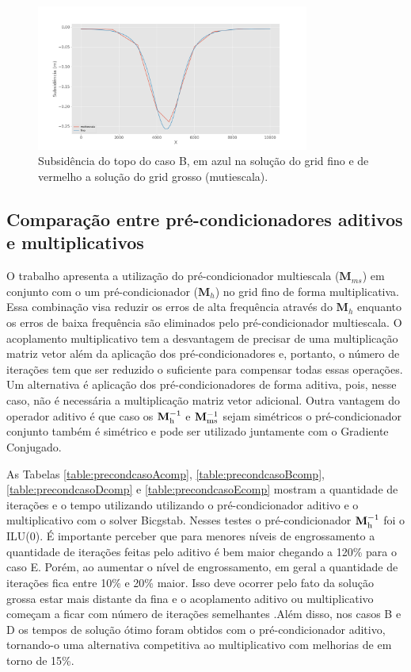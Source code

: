 \begin{figure}[!htbp]
\centering
\includegraphics[width=0.8\textwidth]{chap08/figs/Reservoir320x320_10x10_subsidence_multiscale.png}
\caption{Subsidência do topo do caso B, em azul na solução do grid fino e de vermelho a solução do grid grosso (mutiescala). }
\label{fig:subsidence} 
\end{figure}


\subsection{Comparação entre pré-condicionadores aditivos e multiplicativos}

O trabalho \cite{casteletto} apresenta a utilização do pré-condicionador multiescala ($\mathbf{M}_{ms}$) em conjunto com o um pré-condicionador ($\mathbf{M}_h$) no grid fino de forma multiplicativa. 
Essa combinação visa reduzir os erros de alta frequência através do $\mathbf{M}_h$ enquanto os erros de baixa frequência são eliminados pelo pré-condicionador multiescala. 
O acoplamento multiplicativo tem a desvantagem de precisar de uma multiplicação matriz vetor além da aplicação dos pré-condicionadores
e, portanto, o número de iterações tem que ser reduzido o suficiente para compensar todas essas operações. Um alternativa é aplicação
dos pré-condicionadores de forma aditiva, pois, nesse caso, não é necessária a multiplicação matriz vetor adicional. Outra vantagem do operador aditivo é que caso os $\mathbf{M}^{-1}_{\text{h}}$ e $\mathbf{M}^{-1}_{\text{ms}}$ sejam simétricos o pré-condicionador conjunto também é simétrico e pode ser utilizado juntamente com o Gradiente Conjugado.


As Tabelas \ref{table:precondcasoAcomp}, \ref{table:precondcasoBcomp}, \ref{table:precondcasoDcomp} e \ref{table:precondcasoEcomp} mostram a quantidade de iterações e o tempo utilizando utilizando o pré-condicionador aditivo e o multiplicativo com o solver Bicgstab. Nesses testes o pré-condicionador $\mathbf{M}^{-1}_{\text{h}}$ foi o ILU(0). É importante perceber que para menores níveis de engrossamento a quantidade de iterações feitas pelo aditivo é bem maior chegando a 120\% para o caso E. Porém, ao aumentar o nível de engrossamento, em geral a quantidade de iterações fica entre 10\% e 20\% maior. Isso deve ocorrer pelo fato da solução grossa estar mais distante da fina e o acoplamento aditivo ou multiplicativo começam a ficar com número de iterações semelhantes .Além disso, nos casos B e D os tempos de solução ótimo foram obtidos com o pré-condicionador aditivo, tornando-o uma alternativa competitiva ao multiplicativo com melhorias de em torno de 15\%.

